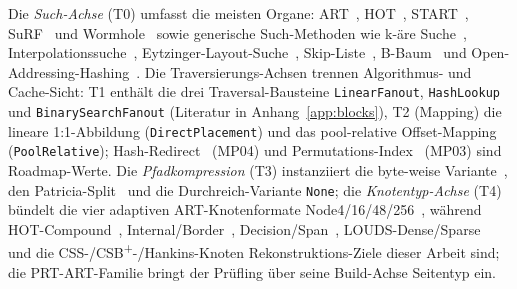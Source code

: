 \begin{nurkurz}
Die \emph{Such-Achse} (T0) umfasst die meisten Organe: ART~\cite{leis2013art}, HOT~\cite{binna2018hot},
START~\cite{fent2020start}, SuRF~\cite{zhang2018surf} und Wormhole~\cite{wu2019wormhole} sowie generische
Such-Methoden wie k-äre Suche~\cite{schlegel2009kary}, Interpolationssuche~\cite{perl1978interpolation},
Eytzinger-Layout-Suche~\cite{khuong2017eytzinger}, Skip-Liste~\cite{pugh1990skiplist},
B-Baum~\cite{bayer1972btree} und Open-Addressing-Hashing~\cite{knuth1998taocp3}. Die Traversierungs-Achsen
trennen Algorithmus- und Cache-Sicht: T1 enthält die drei Traversal-Bausteine
\texttt{Linear\allowbreak{}Fanout}, \texttt{Hash\allowbreak{}Lookup} und
\texttt{Binary\allowbreak{}Search\allowbreak{}Fanout} (Literatur in Anhang~\ref{app:blocks}), T2 (Mapping) die
lineare 1:1-Abbildung (\texttt{Direct\allowbreak{}Placement}) und das pool-relative Offset-Mapping
(\texttt{Pool\allowbreak{}Relative}); Hash-Redirect~\cite{wu2019wormhole} (MP04) und
Permutations-Index~\cite{mao2012masstree} (MP03) sind Roadmap-Werte.
Die \emph{Pfadkompression} (T3) instanziiert die byte-weise Variante~\cite{leis2013art}, den
Patricia-Split~\cite{morrison1968patricia,binna2018hot} und die Durchreich-Variante \texttt{None}; die
\emph{Knotentyp-Achse} (T4) bündelt die vier adaptiven ART-Knotenformate Node4/16/48/256~\cite{leis2013art},
während HOT-Compound~\cite{binna2018hot}, Internal/Border~\cite{mao2012masstree},
Decision/Span~\cite{schmeisser2022b2tree}, LOUDS-Dense/Sparse~\cite{zhang2018surf} und die
CSS-/CSB\textsuperscript{+}-/Hankins-Knoten Rekonstruktions-Ziele dieser Arbeit sind; die PRT-ART-Familie
bringt der Prüfling über seine Build-Achse Seitentyp ein.
\end{nurkurz}

